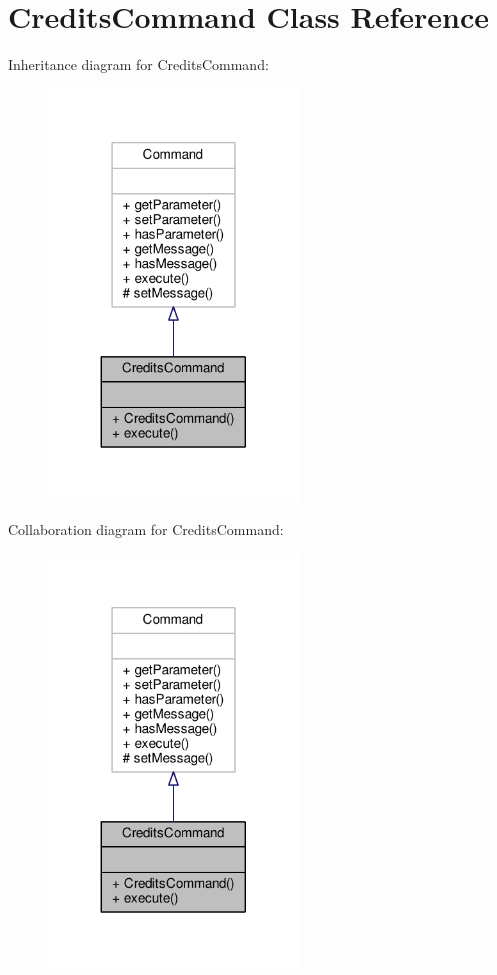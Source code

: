 \hypertarget{classCreditsCommand}{\section{Credits\-Command Class Reference}
\label{classCreditsCommand}
}


Inheritance diagram for Credits\-Command\-:
\nopagebreak
\begin{figure}[H]
\begin{center}
\leavevmode
\includegraphics[width=188pt]{classCreditsCommand__inherit__graph}
\end{center}
\end{figure}


Collaboration diagram for Credits\-Command\-:
\nopagebreak
\begin{figure}[H]
\begin{center}
\leavevmode
\includegraphics[width=188pt]{classCreditsCommand__coll__graph}
\end{center}
\end{figure}
